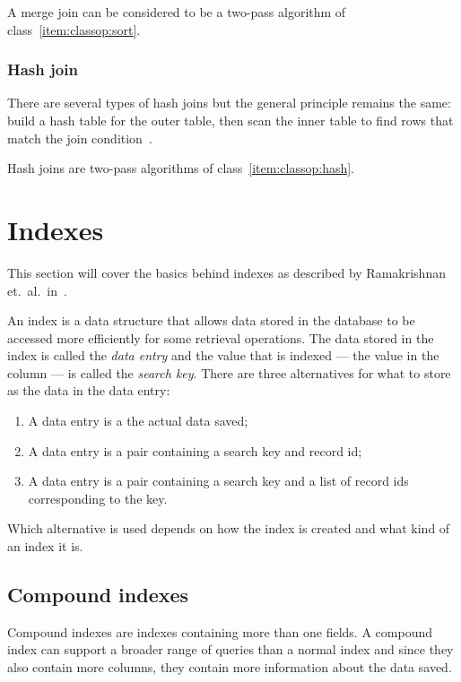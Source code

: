 A merge join can be considered to be a two-pass algorithm of
class~\ref{item:classop:sort}.

\subsubsection{Hash join}
There are several types of hash joins but the general principle remains the
same: build a hash table for the outer table, then scan the inner table to find
rows that match the join
condition~\cite[p.~732-738]{garcia-molina_2002_database_dstcb}.

Hash joins are two-pass algorithms of class~\ref{item:classop:hash}.

\section{Indexes}
This section will cover the basics behind indexes as described by Ramakrishnan
et.\ al.\ in~\cite[Ch.~8]{ramakrishnan_2003_database_dms}.

An index is a data structure that allows data stored in the database to be
accessed more efficiently for some retrieval operations. The data stored in the
index is called the \textit{data entry} and the value that is indexed --- the
value in the column --- is called the \textit{search key}. There are three
alternatives for what to store as the data in the data entry:

\begin{enumerate}
\item\label{item:indexes:alt1} A data entry is a the actual data saved;
\item\label{item:indexes:alt2} A data entry is a pair containing a search key
  and record id;
\item\label{item:indexes:alt3} A data entry is a pair containing a search key
  and a list of record ids corresponding to the key.
\end{enumerate}

Which alternative is used depends on how the index is created and what kind of
an index it is.

\subsection{Compound indexes}
Compound indexes are indexes containing more than one fields. A compound index
can support a broader range of queries than a normal index and since they also
contain more columns, they contain more information about the data saved.

